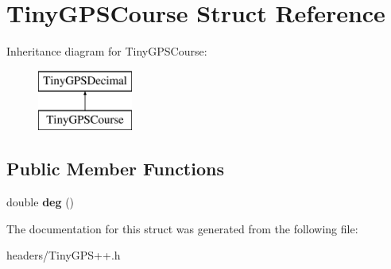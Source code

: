 \hypertarget{struct_tiny_g_p_s_course}{}\section{Tiny\+G\+P\+S\+Course Struct Reference}
\label{struct_tiny_g_p_s_course}
Inheritance diagram for Tiny\+G\+P\+S\+Course\+:\begin{figure}[H]
\begin{center}
\leavevmode
\includegraphics[height=2.000000cm]{struct_tiny_g_p_s_course}
\end{center}
\end{figure}
\subsection*{Public Member Functions}
\begin{DoxyCompactItemize}
\item 
double {\bfseries deg} ()\hypertarget{struct_tiny_g_p_s_course_a76dc8ae6c2fe5ead9b44c8d53a3272ca}{}\label{struct_tiny_g_p_s_course_a76dc8ae6c2fe5ead9b44c8d53a3272ca}

\end{DoxyCompactItemize}


The documentation for this struct was generated from the following file\+:\begin{DoxyCompactItemize}
\item 
headers/Tiny\+G\+P\+S++.\+h\end{DoxyCompactItemize}
